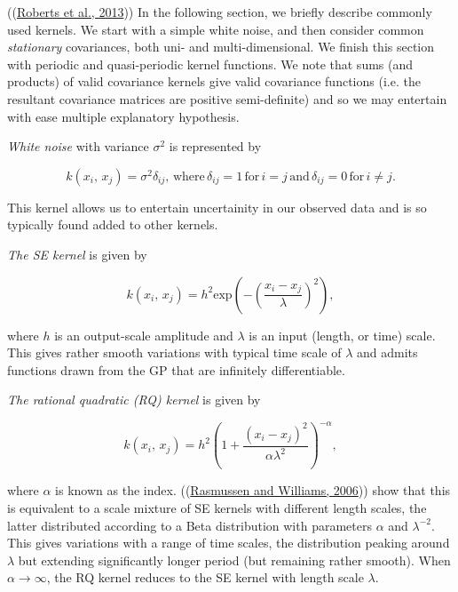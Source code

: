 \documentclass[a4paper, 10pt]{article}
\begin{document}
\begin{flushleft}
   ((\hyperref[Roberts2013]{Roberts et al., 2013})) In the following section, we briefly describe commonly used kernels. We start with a simple white noise, and then consider common \textit{stationary} covariances, both uni- and multi-dimensional. We finish this section with periodic and quasi-periodic kernel functions. We note that sums (and products) of valid covariance kernels give valid covariance functions (i.e. the resultant covariance matrices are positive semi-definite) and so we may entertain with ease multiple explanatory hypothesis. 

   \vspace{1em}

   \textit{White noise} with variance $\sigma^2$ is represented by
   
   $$k(x_{i}, \, x_{j}) = \sigma^2\delta_{ij}, \, \text{where} \, \delta_{ij} = 1 \, \text{for} \, i = j \, \text{and} \, \delta_{ij} = 0 \, \text{for} \, i \neq j.$$

   This kernel allows us to entertain uncertainity in our observed data and is so typically found added to other kernels.

   \vspace{1em}

   \textit{The SE kernel} is given by

   $$k(x_{i}, \, x_{j}) = h^{2} \text{exp}(-(\frac{x_i - x_j}{\lambda})^2),$$ 

   where $h$ is an output-scale amplitude and $\lambda$ is an input (length, or time) scale. This gives rather smooth variations with typical time scale of $\lambda$ and admits functions drawn from the GP that are infinitely differentiable.

   \vspace{1em}

   \textit{The rational quadratic (RQ) kernel} is given by

   $$k(x_{i}, \, x_{j}) = h^{2} (1 + \frac{(x_{i} - x_{j})^2}{\alpha\lambda^2})^{-\alpha},$$

   where $\alpha$ is known as the index. ((\hyperref[Rasmussen2006]{Rasmussen and Williams, 2006})) show that this is equivalent to a scale mixture of SE kernels with different length scales, the latter distributed according to a Beta distribution with parameters $\alpha$ and $\lambda^{-2}$. This gives variations with a range of time scales, the distribution peaking around $\lambda$ but extending significantly longer period (but remaining rather smooth). When $\alpha \to \infty$, the RQ kernel reduces to the SE kernel with length scale $\lambda$.


\end{flushleft}
\end{document}
